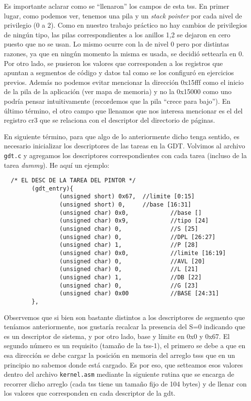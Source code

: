 Es importante aclarar como se ``llenaron'' los campos de esta tss. En primer lugar, como podemos ver, tenemos una pila y un \emph{stack pointer} por cada nivel de privilegio (0 a 2). Como en nuestro trabajo práctico no hay cambios de privilegios de ningún tipo, las pilas correspondientes a los anillos 1,2 se dejaron en cero puesto que no se usan. Lo mismo ocurre con la de nivel 0 pero por distintas razones, ya que en ningún momento la misma es usada, se decidió settearla en 0. Por otro lado, se pusieron los valores que corresponden a los registros que apuntan a segmentos de código y datos tal como se los configuró en ejercicios previos. Además no podemos evitar mencionar la dirección 0x15fff como el inicio de la pila de la aplicación (ver mapa de memoria) y no la 0x15000 como uno podría pensar intuitivamente (recordemos que la pila ``crece para bajo''). En último término, el otro campo que llenamos que nos interesa mencionar es el del registro cr3 que se relaciona con el descriptor del directorio de páginas.

En siguiente término, para que algo de lo anteriormente dicho tenga sentido, es necesario inicializar los descriptores de las tareas en la GDT. Volvimos al archivo \texttt{gdt.c} y agregamos los descriptores correspondientes con cada tarea (incluso de la tarea \emph{dummy}). He aquí un ejemplo: 

\begin{verbatim}
  /* EL DESC DE LA TAREA DEL PINTOR */
        (gdt_entry){
                (unsigned short) 0x67,  //limite [0:15]  
                (unsigned short) 0,     //base [16:31]
                (unsigned char) 0x0,            //base []
                (unsigned char) 0x9,            //tipo [24]
                (unsigned char) 0,              //S [25]
                (unsigned char) 0,              //DPL [26:27]
                (unsigned char) 1,              //P [28]
                (unsigned char) 0x0,            //limite [16:19]
                (unsigned char) 0,              //AVL [20]
                (unsigned char) 0,              //L [21]
                (unsigned char) 1,              //DB [22]
                (unsigned char) 0,              //G [23]
                (unsigned char) 0x00            //BASE [24:31]
        },
\end{verbatim}

Observemos que si bien son bastante distintos a los descriptores de segmento que teníamos anteriormente, nos gustaría recalcar la presencia del S=0 indicando que es un descriptor de sistema, y por otro lado, base y límite en 0x0 y 0x67. El segundo número es un requisito (tamaño de la tss-1), el primero se debe a que en esa dirección se debe cargar la posición en memoria del arreglo tsss que en un principio no sabemos donde está cargado. Es por eso, que setteamos esos valores dentro del archivo \texttt{kernel.asm} mediante la siguiente rutina que se encarga de recorrer dicho arreglo (cada tss tiene un tamaño fijo de 104 bytes) y de llenar con los valores que corresponden en cada descriptor de la gdt. 

